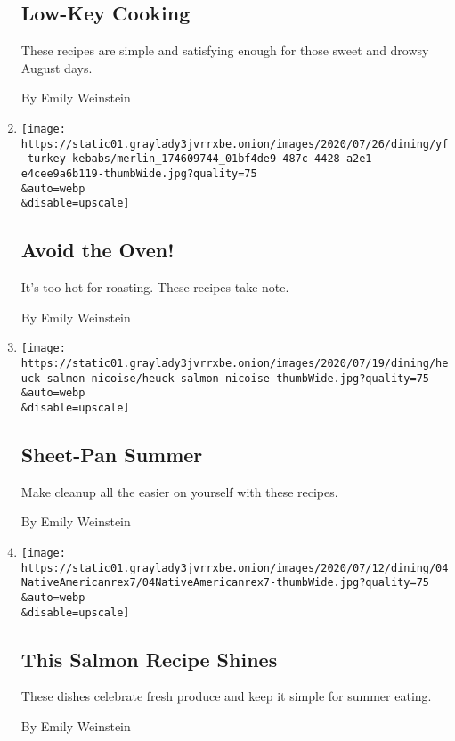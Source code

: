 \begin{enumerate}
  \hypertarget{low-key-cooking}{%
  \subsection{Low-Key Cooking}\label{low-key-cooking}}

  These recipes are simple and satisfying enough for those sweet and
  drowsy August days.

  By Emily Weinstein
\item
  \href{/2020/07/24/dining/avoid-the-oven.html}{}

  \texttt{[image: https://static01.graylady3jvrrxbe.onion/images/2020/07/26/dining/yf-turkey-kebabs/merlin\_174609744\_01bf4de9-487c-4428-a2e1-e4cee9a6b119-thumbWide.jpg?quality=75\\\&auto=webp\\\&disable=upscale]}

  \hypertarget{avoid-the-oven}{%
  \subsection{Avoid the Oven!}\label{avoid-the-oven}}

  It's too hot for roasting. These recipes take note.

  By Emily Weinstein
\item
  \href{/2020/07/17/dining/sheet-pan-summer.html}{}

  \texttt{[image: https://static01.graylady3jvrrxbe.onion/images/2020/07/19/dining/heuck-salmon-nicoise/heuck-salmon-nicoise-thumbWide.jpg?quality=75\\\&auto=webp\\\&disable=upscale]}

  \hypertarget{sheet-pan-summer}{%
  \subsection{Sheet-Pan Summer}\label{sheet-pan-summer}}

  Make cleanup all the easier on yourself with these recipes.

  By Emily Weinstein
\item
  \href{/2020/07/10/dining/this-salmon-recipe-shines.html}{}

  \texttt{[image: https://static01.graylady3jvrrxbe.onion/images/2020/07/12/dining/04NativeAmericanrex7/04NativeAmericanrex7-thumbWide.jpg?quality=75\\\&auto=webp\\\&disable=upscale]}

  \hypertarget{this-salmon-recipe-shines}{%
  \subsection{This Salmon Recipe
  Shines}\label{this-salmon-recipe-shines}}

  These dishes celebrate fresh produce and keep it simple for summer
  eating.

  By Emily Weinstein
\end{enumerate}

